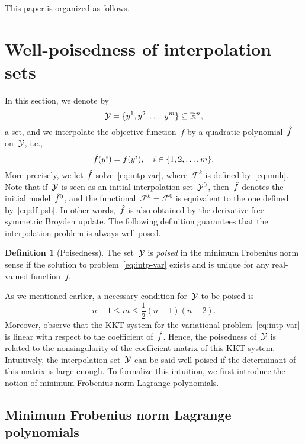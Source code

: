 \documentclass[draft]{article}
\numberwithin{equation}{section}
\theoremstyle{definition}
\newtheorem{definition}{Definition}[section]
\newcommand{\obj}{f}
\newcommand{\objm}[1][]{\hat{\obj}\ifblank{#1}{}{^{#1}}}
\newcommand{\R}{\mathbb{R}}
\newcommand{\set}[2][]{#1\{#2#1\}}
\newcommand{\xpt}[1][]{\mathcal{Y}\ifblank{#1}{}{^{#1}}}
\begin{document}
This paper is organized as follows.

\section{Well-poisedness of interpolation sets}
\label{sec:well-poisedness}

In this section, we denote by
\begin{equation*}
    \xpt = \set{y^1, y^2, \dots, y^m} \subseteq \R^n,
\end{equation*}
a set, and we interpolate the objective function~$\obj$ by a quadratic polynomial~$\objm$ on~$\xpt$, i.e.,
\begin{equation}
    \label{eq:intp-cond-gen}
    \objm(y^i) = \obj(y^i), \quad i \in \set{1, 2, \dots, m}.
\end{equation}
More precisely, we let~$\objm$ solve~\eqref{eq:intp-var}, where~$\mathcal{F}^k$ is defined by~\eqref{eq:mnh}.
Note that if~$\xpt$ is seen as an initial interpolation set~$\xpt[0]$, then~$\objm$ denotes the initial model~$\objm[0]$, and the functional~$\mathcal{F}^k = \mathcal{F}^0$ is equivalent to the one defined by~\eqref{eq:df-psb}.
In other words,~$\objm$ is also obtained by the derivative-free symmetric Broyden update.
The following definition guarantees that the interpolation problem is always well-posed.

\begin{definition}[Poisedness]
    The set~$\xpt$ is \emph{poised} in the minimum Frobenius norm sense if the solution to problem~\eqref{eq:intp-var} exists and is unique for any real-valued function~$\obj$.
\end{definition}

As we mentioned earlier, a necessary condition for~$\xpt$ to be poised is
\begin{equation*}
    n + 1 \le m \le \frac{1}{2} (n + 1) (n + 2).
\end{equation*}
Moreover, observe that the KKT system for the variational problem~\eqref{eq:intp-var} is linear with respect to the coefficient of~$\objm$.
Hence, the poisedness of~$\xpt$ is related to the nonsingularity of the coefficient matrix of this KKT system.
Intuitively, the interpolation set~$\xpt$ can be said well-poised if the determinant of this matrix is large enough.
To formalize this intuition, we first introduce the notion of minimum Frobenius norm Lagrange polynomials.

\subsection{Minimum Frobenius norm Lagrange polynomials}
\end{document}
